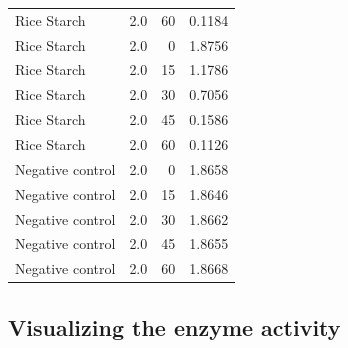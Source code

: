 \documentclass[
  12pt,
]{article}
\begin{document}
{\begin{longtable}[]{@{}lrrr@{}}
Rice Starch & 2.0 & 60 & 0.1184 \\
Rice Starch & 2.0 & 0 & 1.8756 \\
Rice Starch & 2.0 & 15 & 1.1786 \\
Rice Starch & 2.0 & 30 & 0.7056 \\
Rice Starch & 2.0 & 45 & 0.1586 \\
Rice Starch & 2.0 & 60 & 0.1126 \\
Negative control & 2.0 & 0 & 1.8658 \\
Negative control & 2.0 & 15 & 1.8646 \\
Negative control & 2.0 & 30 & 1.8662 \\
Negative control & 2.0 & 45 & 1.8655 \\
Negative control & 2.0 & 60 & 1.8668 \\
\end{longtable}
}

\subsection{Visualizing the enzyme
activity}\label{visualizing-the-enzyme-activity}
\end{document}
